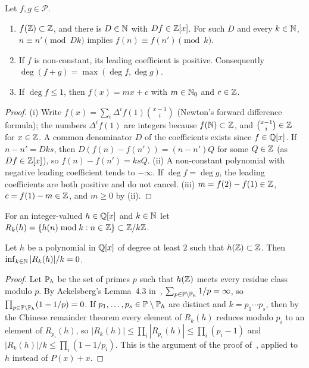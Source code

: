 \begin{lemma}\label{IA:lem:P}
Let $f,g\in\mathcal P$.
\begin{enumerate}[label=\textup{(\roman*)}]
\item $f(\Z)\subset\Z$, and there is $D\in\N$ with $Df\in\Z[x]$. For such $D$ and every $k\in\N$,
$n\equiv n'\pmod{Dk}$ implies $f(n)\equiv f(n')\pmod k$.
\item If $f$ is non-constant, its leading coefficient is positive. Consequently
$\deg(f+g)=\max(\deg f,\deg g)$.
\item If $\deg f\le1$, then $f(x)=mx+c$ with $m\in\N_0$ and $c\in\Z$.
\end{enumerate}
\end{lemma}

\begin{proof}
(i) Write $f(x)=\sum_{i}\Delta^if(1)\binom{x-1}{i}$ (Newton's forward difference formula); the
numbers $\Delta^if(1)$ are integers because $f(\N)\subset\Z$, and $\binom{x-1}i\in\Z$ for $x\in\Z$.
A common denominator $D$ of the coefficients exists since $f\in\Q[x]$. If $n-n'=Dks$, then
$D(f(n)-f(n'))=(n-n')Q$ for some $Q\in\Z$ (as $Df\in\Z[x]$), so $f(n)-f(n')=ksQ$.
(ii) A non-constant polynomial with negative leading coefficient tends to $-\infty$. If
$\deg f=\deg g$, the leading coefficients are both positive and do not cancel.
(iii) $m=f(2)-f(1)\in\Z$, $c=f(1)-m\in\Z$, and $m\ge0$ by (ii).
\end{proof}

For an integer-valued $h\in\Q[x]$ and $k\in\N$ let $R_k(h)=\{h(n)\bmod k:n\in\Z\}\subset\Z/k\Z$.

\begin{lemma}[Ackelsberg]\label{IA:lem:Rk}
Let $h$ be a polynomial in $\Q[x]$ of degree at least $2$ such that $h(\Z)\subset\Z$. Then
$\inf_{k\in\N}|R_k(h)|/k=0$.
\end{lemma}

\begin{proof}
Let $\P_h$ be the set of primes $p$ such that $h(\Z)$ meets every residue class modulo $p$. By
Ackelsberg's Lemma~4.3 in~\cite{ackelsberg2024counterexamples}, $\sum_{p\in\P\setminus\P_h}1/p=\infty$,
so $\prod_{p\in\P\setminus\P_h}(1-1/p)=0$. If $p_1,\dots,p_s\in\P\setminus\P_h$ are distinct and
$k=p_1\cdots p_s$, then by the Chinese remainder theorem every element of $R_k(h)$ reduces modulo
$p_i$ to an element of $R_{p_i}(h)$, so $|R_k(h)|\le\prod_i|R_{p_i}(h)|\le\prod_i(p_i-1)$ and
$|R_k(h)|/k\le\prod_i(1-1/p_i)$. This is the argument of the proof
of~\cite[Theorem~1.5]{ackelsberg2024counterexamples}, applied to $h$ instead of $P(x)+x$.
\end{proof}

